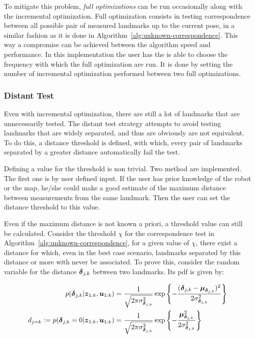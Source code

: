 To mitigate this problem, \emph{full optimizations} can be run occasionally along with the incremental optimization. Full optimization consists in testing correspondence between all possible pair of measured landmarks up to the current pose, in a similar fashion as it is done in Algorithm~\ref{alg:unknown-correspondence}. This way a compromise can be achieved between the algorithm speed and performance. In this implementation the user has the is able to choose the frequency with which the full optimization are run. It is done by setting the number of incremental optimization performed between two full optimizations.  

\subsubsection{Distant Test}

Even with incremental optimization, there are still a lot of landmarks that are unnecessarily tested. The distant test strategy attempts to avoid testing landmarks that are widely separated, and thus are obviously are not equivalent. To do this, a distance threshold is defined, with which, every pair of landmarks separated by a greater distance automatically fail the test. 

Defining a value for the threshold is non trivial. Two method are implemented. The first one is by user defined input. If the user has prior knowledge of the robot or the map, he/she could make a good estimate of the maximum distance between measurements from the same landmark. Then the user can set the distance threshold to this value.

Even if the maximum distance is not known a priori, a threshold value can still be calculated. Consider the threshold $\chi$ for the correspondence test in Algorithm~\ref{alg:unknown-correspondence}, for a given value of $\chi$, there exist a distance for which, even in the best case scenario, landmarks separated by this distance or more with never be associated. To prove this, consider the random variable for the distance  $\boldsymbol{\delta}_{j,k}$ between two landmarks. Its pdf is given by:

\begin{align}
p(\boldsymbol{\delta}_{j,k}|\boldsymbol{z}_{1:k},\boldsymbol{u}_{1:k})&=
\frac{1}{\sqrt{2\pi\sigma_{\boldsymbol{\delta}_{j,k}}^2}}
\exp\left\lbrace -\frac{(\boldsymbol{\delta}_{j,k}-\boldsymbol{\mu}_{\boldsymbol{\delta}_{j,k}})^2}{2\sigma_{\boldsymbol{\delta}_{j,k}}^2}\right\rbrace\\
d_{j=k} \vcentcolon= p(\boldsymbol{\delta}_{j,k}=0|\boldsymbol{z}_{1:k},\boldsymbol{u}_{1:k})&=
\frac{1}{\sqrt{2\pi\sigma_{\boldsymbol{\delta}_{j,k}}^2}}
\exp\left\lbrace -\frac{\boldsymbol{\mu}_{\boldsymbol{\delta}_{j,k}}^2}{2\sigma_{\boldsymbol{\delta}_{j,k}}^2}\right\rbrace 
\end{align}

